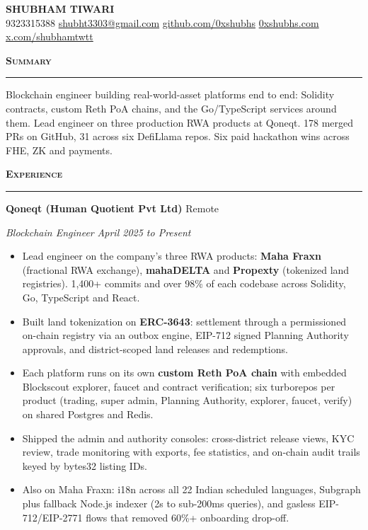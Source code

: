 \documentclass[letterpaper,10pt]{article}
\newcommand{\sectionrule}[1]{%
  \vspace{3pt}%
  {\large\scshape\bfseries #1}\par\vspace{1pt}\hrule\vspace{3pt}%
}
\newcommand{\entry}[2]{%
  \textbf{#1} \hfill {\small #2}\par%
}
\newcommand{\subentry}[2]{%
  {\itshape #1} \hfill {\small\itshape #2}\par\vspace{1pt}%
}
\newenvironment{bullets}{%
  \begin{itemize}\setlength{\itemsep}{0pt}\setlength{\parskip}{0pt}
\setlength{\leftmargini}{1.15em}\setlength{\topsep}{1pt}%
}{\end{itemize}\vspace{1pt}}
\begin{document}
\begin{center}
  {\LARGE\bfseries SHUBHAM TIWARI}\\[1pt]
  {\small 9323315388 \;\textperiodcentered\; \href{mailto:shubht3303@gmail.com}{shubht3303@gmail.com}
  \;\textperiodcentered\; \href{https://github.com/0xshubhs}{github.com/0xshubhs}
  \;\textperiodcentered\; \href{https://www.0xshubhs.com}{0xshubhs.com}
  \;\textperiodcentered\; \href{https://x.com/shubhamtwtt}{x.com/shubhamtwtt}}
\end{center}

\sectionrule{Summary}
Blockchain engineer building real-world-asset platforms end to end: Solidity contracts, custom Reth PoA chains, and
the Go/TypeScript services around them. Lead engineer on three production RWA products at Qoneqt. 178 merged PRs
on GitHub, 31 across six DefiLlama repos. Six paid hackathon wins across FHE, ZK and payments.

\sectionrule{Experience}

\entry{Qoneqt (Human Quotient Pvt Ltd)}{Remote}
\subentry{Blockchain Engineer}{April 2025 to Present}
\begin{bullets}
  \item Lead engineer on the company's three RWA products: \textbf{Maha Fraxn} (fractional RWA exchange),
        \textbf{mahaDELTA} and \textbf{Propexty} (tokenized land registries). 1,400+ commits and over 98\% of
        each codebase across Solidity, Go, TypeScript and React.
  \item Built land tokenization on \textbf{ERC-3643}: settlement through a permissioned on-chain registry via an
        outbox engine, EIP-712 signed Planning Authority approvals, and district-scoped land releases and redemptions.
  \item Each platform runs on its own \textbf{custom Reth PoA chain} with embedded Blockscout explorer, faucet and
        contract verification; six turborepos per product (trading, super admin, Planning Authority, explorer, faucet,
        verify) on shared Postgres and Redis.
  \item Shipped the admin and authority consoles: cross-district release views, KYC review, trade monitoring with
        exports, fee statistics, and on-chain audit trails keyed by bytes32 listing IDs.
  \item Also on Maha Fraxn: i18n across all 22 Indian scheduled languages, Subgraph plus fallback Node.js indexer
        (2s to sub-200ms queries), and gasless EIP-712/EIP-2771 flows that removed 60\%+ onboarding drop-off.
\end{bullets}
\end{document}
